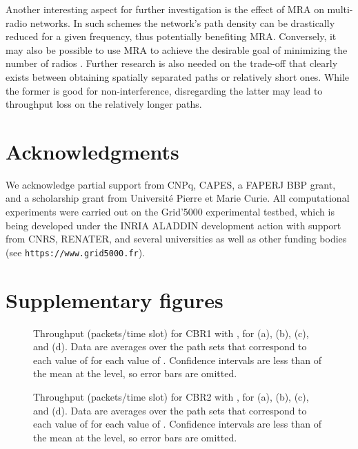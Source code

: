 \documentclass{article}
\begin{document}
Another interesting aspect for further investigation is the effect of MRA on
multi-radio networks. In such schemes the network's path density can be
drastically reduced for a given frequency, thus potentially benefiting MRA.
Conversely, it may also be possible to use MRA to achieve the desirable goal of
minimizing the number of radios \cite{Bahl2004,Raniwala2005}. Further research
is also needed on the trade-off that clearly exists between obtaining spatially
separated paths or relatively short ones. While the former is good for
non-interference, disregarding the latter may lead to throughput loss on the
relatively longer paths.

\section*{Acknowledgments}

We acknowledge partial support from CNPq, CAPES, a FAPERJ BBP grant, and a
scholarship grant from Universit\'{e} Pierre et Marie Curie. All computational
experiments were carried out on the Grid'5000 experimental testbed, which is
being developed under the INRIA ALADDIN development action with support from
CNRS, RENATER, and several universities as well as other funding bodies (see
\texttt{https://www.grid5000.fr}).




\newpage
\appendix
\setcounter{figure}{0}
\renewcommand\thefigure{\Alph{section}.\arabic{figure}}
\section{Supplementary figures}
\begin{figure}[t]
\centering
{}
\caption[Throughput (packets/time slot) for CBR1]{Throughput (packets/time slot)
for CBR1 with , for  (a),  (b),  (c), and
 (d). Data are averages over the  path sets that correspond to
each value of  for each value of . Confidence intervals are less
than  of the mean at the  level, so error bars are omitted.}
\label{figureS1}
\end{figure}

\begin{figure}[p]
\centering
{}
\caption[Throughput (packets/time slot) for CBR2]{Throughput (packets/time slot)
for CBR2 with , for  (a),  (b),  (c), and
 (d). Data are averages over the  path sets that correspond to
each value of  for each value of . Confidence intervals are less
than  of the mean at the  level, so error bars are omitted.}
\label{figureS2}
\end{figure}
\end{document}
